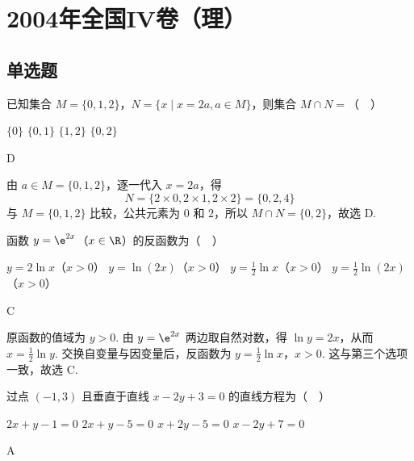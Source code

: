 \chapter{2004年全国IV卷（理）}
\section{单选题}
\begin{problem}
已知集合 \(M = \{0, 1, 2\}\)，\(N = \{x \mid x = 2a, a \in M\}\)，则集合 \(M \cap N =\)（\(\quad\)）

\choices
    {\( \{0\} \)}
    {\(\{0,1\}\)}
    {\(\{1,2\}\)}
    {\(\{0,2\}\)}
\end{problem}

\begin{answer}
D
\end{answer}

\begin{solution}
由 \(a\in M=\{0,1,2\}\)，逐一代入 \(x=2a\)，得
\[
N=\{2\times0,2\times1,2\times2\}=\{0,2,4\}
\]
与 \(M=\{0,1,2\}\) 比较，公共元素为 \(0\) 和 \(2\)，所以 \(M\cap N=\{0,2\}\)，故选 D.
\end{solution}

\begin{problem}
函数 \(y = \e^{2x}\)（\(x \in \R\)）的反函数为（\(\quad\)）

\choices
    {\(y = 2\ln x\)（\(x > 0\)）}
    {\(y = \ln\left(2x\right)\)（\(x > 0\)）}
    {\(y = \frac{1}{2}\ln x\)（\(x > 0\)）}
    {\(y = \frac{1}{2}\ln\left(2x\right)\)（\(x > 0\)）}
\end{problem}

\begin{answer}
C
\end{answer}

\begin{solution}
原函数的值域为 \(y>0\). 由 \(y=\e^{2x}\) 两边取自然对数，得 \(\ln y=2x\)，从而 \(x=\frac12\ln y\). 交换自变量与因变量后，反函数为
\(y=\frac12\ln x\)，\(x>0\).
这与第三个选项一致，故选 C.
\end{solution}

\begin{problem}
过点 \((-1, 3)\) 且垂直于直线 \(x - 2y + 3 = 0\) 的直线方程为（\(\quad\)）

\choices
    {\(2x + y - 1 = 0\)}
    {\(2x + y - 5 = 0\)}
    {\(x + 2y - 5 = 0\)}
    {\(x - 2y + 7 = 0\)}
\end{problem}

\begin{answer}
A
\end{answer}

